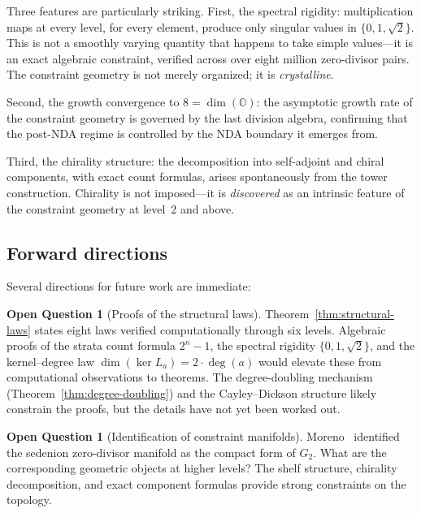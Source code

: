 \documentclass[12pt,a4paper]{article}
\theoremstyle{definition}
\newtheorem{openquestion}[theorem]{Open Question}
\theoremstyle{remark}
\newcommand{\OO}{\mathbb{O}}
\begin{document}
Three features are particularly striking. First, the spectral
rigidity: multiplication maps at every level, for every element,
produce only singular values in $\{0, 1, \sqrt{2}\}$. This is
not a smoothly varying quantity that happens to take simple
values---it is an exact algebraic constraint, verified across
over eight million zero-divisor pairs. The constraint geometry
is not merely organized; it is \emph{crystalline}.

Second, the growth convergence to $8 = \dim(\OO)$: the
asymptotic growth rate of the constraint geometry is governed by
the last division algebra, confirming that the post-NDA regime is
controlled by the NDA boundary it emerges from.

Third, the chirality structure: the decomposition into
self-adjoint and chiral components, with exact count formulas,
arises spontaneously from the tower construction. Chirality is
not imposed---it is \emph{discovered} as an intrinsic feature of
the constraint geometry at level~2 and above.

\subsection{Forward directions}

Several directions for future work are immediate:

\begin{openquestion}[Proofs of the structural laws]
\label{open:proofs}
Theorem~\ref{thm:structural-laws} states eight laws verified
computationally through six levels. Algebraic proofs of the
strata count formula $2^n - 1$, the spectral rigidity
$\{0, 1, \sqrt{2}\}$, and the kernel--degree law
$\dim(\ker L_a) = 2 \cdot \deg(a)$ would elevate these from
computational observations to theorems. The degree-doubling
mechanism (Theorem~\ref{thm:degree-doubling}) and the
Cayley--Dickson structure likely constrain the proofs, but the
details have not yet been worked out.
\end{openquestion}

\begin{openquestion}[Identification of constraint manifolds]
\label{open:manifolds}
Moreno~\cite{Moreno1998} identified the sedenion zero-divisor
manifold as the compact form of $G_2$. What are the corresponding
geometric objects at higher levels? The shelf structure, chirality
decomposition, and exact component formulas provide strong
constraints on the topology.
\end{openquestion}
\end{document}
